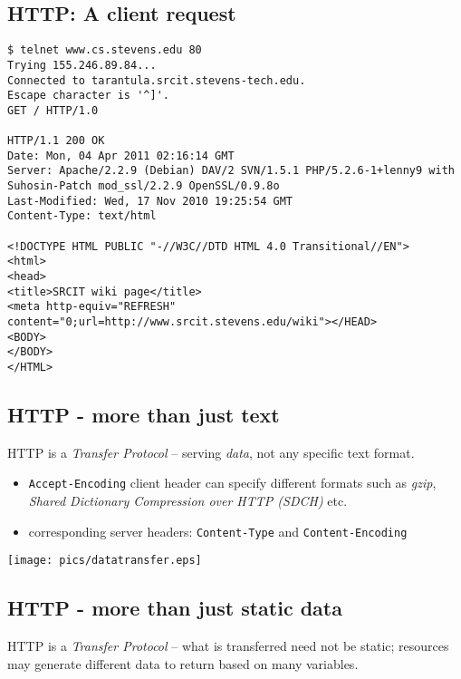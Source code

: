 \documentclass[xga]{xdvislides}
\begin{document}
\subsection{HTTP: A client request}
\newcommand{\smallish}{\fontsize{16}{16}\selectfont}
\smallish
\begin{center}
\begin{verbatim}
$ telnet www.cs.stevens.edu 80
Trying 155.246.89.84...
Connected to tarantula.srcit.stevens-tech.edu.
Escape character is '^]'.
GET / HTTP/1.0

HTTP/1.1 200 OK
Date: Mon, 04 Apr 2011 02:16:14 GMT
Server: Apache/2.2.9 (Debian) DAV/2 SVN/1.5.1 PHP/5.2.6-1+lenny9 with Suhosin-Patch mod_ssl/2.2.9 OpenSSL/0.9.8o
Last-Modified: Wed, 17 Nov 2010 19:25:54 GMT
Content-Type: text/html

<!DOCTYPE HTML PUBLIC "-//W3C//DTD HTML 4.0 Transitional//EN">
<html>
<head>
<title>SRCIT wiki page</title>
<meta http-equiv="REFRESH"
content="0;url=http://www.srcit.stevens.edu/wiki"></HEAD>
<BODY>
</BODY>
</HTML>
\end{verbatim}
\end{center}
\Normalsize

\subsection{HTTP - more than just text}
HTTP is a {\em Transfer Protocol} -- serving {\em data}, not any specific
text format.

\begin{itemize}
	\item {\tt Accept-Encoding} client header can specify different formats
		such as {\em gzip}, {\em Shared Dictionary Compression over HTTP (SDCH)} etc.
	\item corresponding server headers: {\tt Content-Type} and
		{\tt Content-Encoding}
\end{itemize}
\begin{center}
	\texttt{[image: pics/datatransfer.eps]}
\end{center}

\subsection{HTTP - more than just static data}
HTTP is a {\em Transfer Protocol} -- what is transferred need not be
static; resources may generate different data to return based on many
variables.
\end{document}
